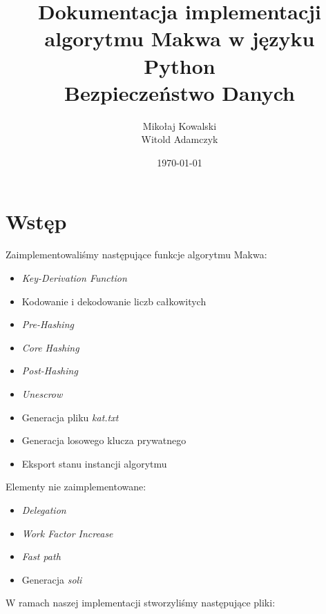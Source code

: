 \documentclass[a4paper,titleauthor]{mwart}
\title{Dokumentacja implementacji algorytmu Makwa w języku Python \\ Bezpieczeństwo Danych}
\author{Mikołaj Kowalski\\Witold Adamczyk}
\affil{Politechnika Warszawska, Instytut Telekomunikacji}
\date{\today}
\begin{document}
	
\maketitle



\tableofcontents
\section{Wstęp}
Zaimplementowaliśmy następujące funkcje algorytmu Makwa:
\begin{itemize}
	\item \textit{Key-Derivation Function}
	\item Kodowanie i dekodowanie liczb całkowitych
	\item \textit{Pre-Hashing}
	\item \textit{Core Hashing}
	\item \textit{Post-Hashing}
	\item \textit{Unescrow}
	\item Generacja pliku \textit{kat.txt}
	\item Generacja losowego klucza prywatnego
	\item Eksport stanu instancji algorytmu
\end{itemize}
Elementy nie zaimplementowane:
\begin{itemize}
	\item \textit{Delegation}
	\item \textit{Work Factor Increase}
	\item \textit{Fast path}
	\item Generacja \textit{soli}
\end{itemize}
W ramach naszej implementacji stworzyliśmy następujące pliki:
\end{document}

